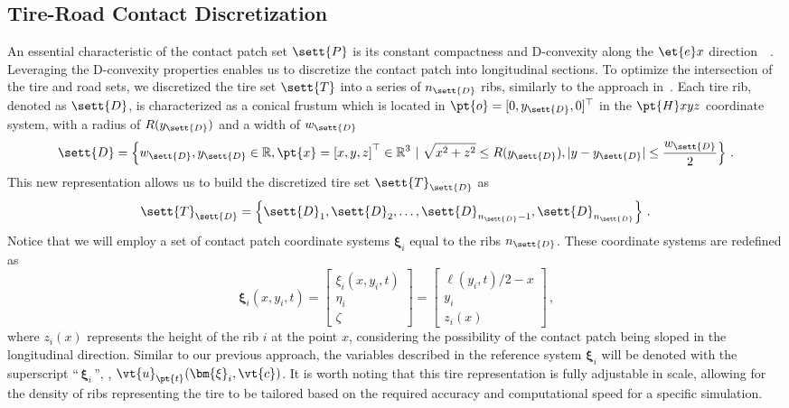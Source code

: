 \subsection{Tire-Road Contact Discretization}

An essential characteristic of the contact patch set $\sett{P}$ is its constant compactness and D-convexity along the $\et{e}x$ direction~~\cite{romano2022analytical, matouvsek2001directional}. Leveraging the D-convexity properties enables us to discretize the contact patch into longitudinal sections. To optimize the intersection of the tire and road sets, we discretized the tire set $\sett{T}$ into a series of $n_\sett{D}$ ribs, similarly to the approach in~\cite{chollet2012model, stocco2024novel}. Each tire rib, denoted as $\sett{D}$, is characterized as a conical frustum which is located in $\pt{o}= [0, y_\sett{D}, 0]^\top$ in the $\pt{H}xyz$ coordinate system, with a radius of $R(y_\sett{D})$ and a width of $w_\sett{D}$
%
\begin{equation*}
  \sett{D} = \left\{ w_\sett{D}, y_\sett{D} \in \mathbb{R}, \pt{x} = \left[ x, y, z \right]^\top \in \mathbb{R}^3 ~|~ \sqrt{x^2+z^2} \leq R(y_\sett{D}), |y-y_\sett{D}| \leq \dfrac{w_\sett{D}}{2} \right\} \, \text{.}
\end{equation*}
%
This new representation allows us to build the discretized tire set $\sett{T}_\sett{D}$ as
%
\begin{equation*}
  \sett{T}_\sett{D} = \left\{ \sett{D}_1, \sett{D}_2, \dots, \sett{D}_{n_\sett{D}-1}, \sett{D}_{n_\sett{D}} \right\} \, \text{.}
\end{equation*}
%
Notice that we will employ a set of contact patch coordinate systems $\bm{\xi}_i$ equal to the ribs $n_\sett{D}$. These coordinate systems are redefined as
%
\begin{equation*}
  \bm{\xi}_i(x, y_i, t) =
  \begin{bmatrix}
    \xi_i(x, y_i, t) \\
    \eta_i \\
    \zeta
  \end{bmatrix}
  =
  \begin{bmatrix}
    \ell(y_i, t)/2 - x \\
    y_i \\
    z_i(x)
  \end{bmatrix} \, \text{,}
\end{equation*}
%
where $z_i(x)$ represents the height of the rib $i$ at the point $x$, considering the possibility of the contact patch being sloped in the longitudinal direction. Similar to our previous approach, the variables described in the reference system $\bm{\xi}_i$ will be denoted with the superscript ``$\,\bm{\xi}_{i}\,$'', \eg{}, $\vt{u}_{\pt{t}}(\bm{\xi}_{i}, \vt{c})$. It is worth noting that this tire representation is fully adjustable in scale, allowing for the density of ribs representing the tire to be tailored based on the required accuracy and computational speed for a specific simulation.

